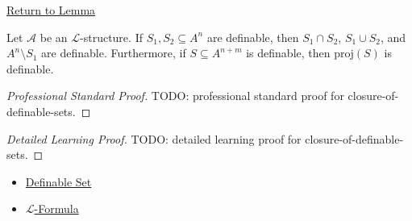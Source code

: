 \newpage
{}
\label{prf:closure-of-definable-sets}

\begin{remark*}[Return]
\hyperref[lem:closure-of-definable-sets]{Return to Lemma}
\end{remark*}

\begin{lemma*}
Let $\mathcal{A}$ be an $\mathcal{L}$-structure. If
$S_1,S_2\subseteq A^n$ are definable, then
$S_1\cap S_2$, $S_1\cup S_2$, and $A^n\setminus S_1$ are definable.
Furthermore, if $S\subseteq A^{n+m}$ is definable, then
$\mathrm{proj}(S)$ is definable.
\end{lemma*}

\begin{proof}[Professional Standard Proof]
\LRAProofBodyStart
TODO: professional standard proof for closure-of-definable-sets.
\end{proof}

\begin{proof}[Detailed Learning Proof]
\LRAProofBodyStart
TODO: detailed learning proof for closure-of-definable-sets.
\end{proof}

\begin{remark*}
\end{remark*}

\begin{dependencies}
\begin{itemize}
  \item \hyperref[def:definable-set]{Definable Set}
  \item \hyperref[def:l-formula]{$\mathcal{L}$-Formula}
\end{itemize}
\end{dependencies}

\clearpage
